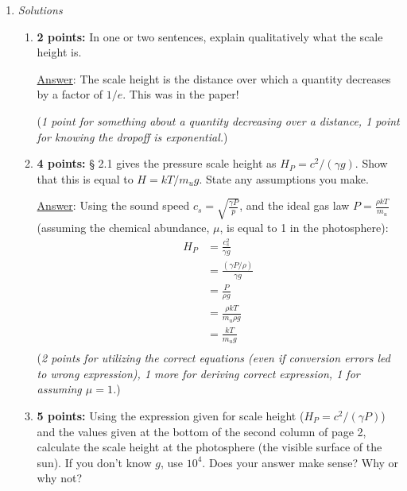 \documentclass[12pt]{article}
\begin{document}
\begin{enumerate}
\item \emph{Solutions}
\begin{enumerate}
    \item \textbf{2 points:} In one or two sentences, explain
        qualitatively what the scale height is.

        {\small\underline{Answer}: The scale height is the distance
            over which a quantity decreases by a factor of $1/e$.
            This was in the paper!

        (\emph{1 point for something about a quantity decreasing over
        a distance, 1 point for knowing the dropoff is exponential.})}

    \item \textbf{4 points:} \S{} 2.1 gives the pressure scale
        height as $H_{P} = c^{2}/(\gamma{g})$. Show that this is
        equal to $H = kT/m_{u}g$. State any assumptions you make.

        {\small\underline{Answer}:
            Using the sound speed $c_s = \sqrt{\frac{\gamma{P}}{p}}$,
            and the ideal gas law $P = \frac{\rho{kT}}{m_{u}}$
            (assuming the chemical abundance, $\mu$, is equal to 1 in
            the photosphere):
            \begin{align*}
             H_{P} &= \frac{c_s^2}{\gamma{g}}\\
                &= \frac{(\gamma{P}/\rho)}{\gamma{g}}\\
                &= \frac{P}{\rho{g}}\\
                &= \frac{\rho{kT}}{m_{u}\rho{g}}\\
                &= \frac{kT}{m_{u}{g}}\\
            \end{align*}
        (\emph{2 points for utilizing the correct equations
        (even if conversion errors led to wrong expression), 1 more for deriving
        correct expression, 1 for assuming $\mu=1$.})}

    \item \textbf{5 points:} Using the expression given for scale
        height ($H_{P} = c^{2}/(\gamma{P})$) and the values given at
        the bottom of the second column of page 2, calculate the
        scale height at the photosphere (the visible surface of
        the sun). If you don't know $g$, use $10^{4}$.
        Does your answer make sense? Why or why not?


\end{enumerate}
\end{enumerate}
\end{document}

